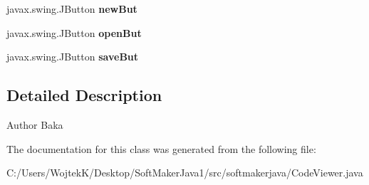 \begin{DoxyCompactItemize}
\item 
javax.\+swing.\+J\+Button {\bfseries new\+But}\hypertarget{classsoftmakerjava_1_1_code_viewer_ae3c60ae3cb920aecedb229604ac24ddd}{}\label{classsoftmakerjava_1_1_code_viewer_ae3c60ae3cb920aecedb229604ac24ddd}

\item 
javax.\+swing.\+J\+Button {\bfseries open\+But}\hypertarget{classsoftmakerjava_1_1_code_viewer_a3a473b4efc1d636a7a87869898f3549f}{}\label{classsoftmakerjava_1_1_code_viewer_a3a473b4efc1d636a7a87869898f3549f}

\item 
javax.\+swing.\+J\+Button {\bfseries save\+But}\hypertarget{classsoftmakerjava_1_1_code_viewer_a8943cf8b2795897c465ee07f473e92e2}{}\label{classsoftmakerjava_1_1_code_viewer_a8943cf8b2795897c465ee07f473e92e2}

\end{DoxyCompactItemize}


\subsection{Detailed Description}
\begin{DoxyAuthor}{Author}
Baka 
\end{DoxyAuthor}


The documentation for this class was generated from the following file\+:\begin{DoxyCompactItemize}
\item 
C\+:/\+Users/\+Wojtek\+K/\+Desktop/\+Soft\+Maker\+Java1/src/softmakerjava/Code\+Viewer.\+java\end{DoxyCompactItemize}
